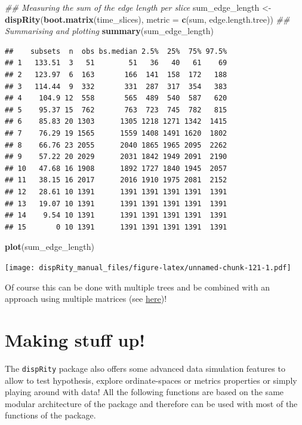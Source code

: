 \documentclass[]{book}
\newenvironment{Shaded}{\begin{snugshade}}{\end{snugshade}}
\newcommand{\CommentTok}[1]{\textcolor[rgb]{0.56,0.35,0.01}{\textit{#1}}}
\newcommand{\DataTypeTok}[1]{\textcolor[rgb]{0.13,0.29,0.53}{#1}}
\newcommand{\KeywordTok}[1]{\textcolor[rgb]{0.13,0.29,0.53}{\textbf{#1}}}
\newcommand{\NormalTok}[1]{#1}
\newcommand{\StringTok}[1]{\textcolor[rgb]{0.31,0.60,0.02}{#1}}
\begin{document}
\begin{Shaded}
\begin{Highlighting}[]
\CommentTok{## Measuring the sum of the edge length per slice}
\NormalTok{sum_edge_length <-}\StringTok{ }\KeywordTok{dispRity}\NormalTok{(}\KeywordTok{boot.matrix}\NormalTok{(time_slices), }\DataTypeTok{metric =} \KeywordTok{c}\NormalTok{(sum, edge.length.tree))}
\CommentTok{## Summarising and plotting}
\KeywordTok{summary}\NormalTok{(sum_edge_length)}
\end{Highlighting}
\end{Shaded}

\begin{verbatim}
##    subsets  n  obs bs.median 2.5%  25%  75% 97.5%
## 1   133.51  3   51        51   36   40   61    69
## 2   123.97  6  163       166  141  158  172   188
## 3   114.44  9  332       331  287  317  354   383
## 4    104.9 12  558       565  489  540  587   620
## 5    95.37 15  762       763  723  745  782   815
## 6    85.83 20 1303      1305 1218 1271 1342  1415
## 7    76.29 19 1565      1559 1408 1491 1620  1802
## 8    66.76 23 2055      2040 1865 1965 2095  2262
## 9    57.22 20 2029      2031 1842 1949 2091  2190
## 10   47.68 16 1908      1892 1727 1840 1945  2057
## 11   38.15 16 2017      2016 1910 1975 2081  2152
## 12   28.61 10 1391      1391 1391 1391 1391  1391
## 13   19.07 10 1391      1391 1391 1391 1391  1391
## 14    9.54 10 1391      1391 1391 1391 1391  1391
## 15       0 10 1391      1391 1391 1391 1391  1391
\end{verbatim}

\begin{Shaded}
\begin{Highlighting}[]
\KeywordTok{plot}\NormalTok{(sum_edge_length)}
\end{Highlighting}
\end{Shaded}

\texttt{[image: dispRity\_manual\_files/figure-latex/unnamed-chunk-121-1.pdf]}

Of course this can be done with multiple trees and be combined with an approach using multiple matrices (see \protect\hyperlink{multi.input}{here})!

\hypertarget{making-stuff-up}{%
\chapter{Making stuff up!}\label{making-stuff-up}}

The \texttt{dispRity} package also offers some advanced data simulation features to allow to test hypothesis, explore ordinate-spaces or metrics properties or simply playing around with data!
All the following functions are based on the same modular architecture of the package and therefore can be used with most of the functions of the package.
\end{document}
